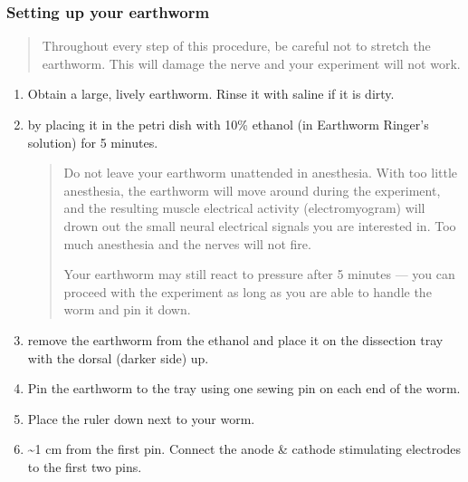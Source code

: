 \documentclass[letterpaper,10pt,english]{jupyterBook}
\begin{document}
\subsubsection{Setting up your earthworm}
\label{\detokenize{Earthworm:setting-up-your-earthworm}}
\sphinxAtStartPar
{}
\begin{quote}

\sphinxAtStartPar
{} Throughout every step of this procedure, be careful not to stretch the earthworm. This will damage the nerve and your experiment will not work.
\end{quote}
\begin{enumerate}
%
\item {} 
\sphinxAtStartPar
Obtain a large, lively earthworm. Rinse it with saline if it is dirty.

\item {} 
\sphinxAtStartPar
{} by placing it in the petri dish with 10\% ethanol (in Earthworm Ringer’s solution) for 5 minutes.
\begin{quote}

\sphinxAtStartPar
{} Do not leave your earthworm unattended in anesthesia. With too little anesthesia, the earthworm will move around during the experiment, and the resulting muscle electrical activity (electromyogram) will drown out the small neural electrical signals you are interested in. Too much anesthesia and the nerves will not fire.

\sphinxAtStartPar
{} Your earthworm may still react to pressure after 5 minutes — you can proceed with the experiment as long as you are able to handle the worm and pin it down.
\end{quote}

\item {} 
\sphinxAtStartPar
{} remove the earthworm from the ethanol and place it on the dissection tray with the dorsal (darker side) up.

\item {} 
\sphinxAtStartPar
Pin the earthworm to the tray using one sewing pin on each end of the worm.

\item {} 
\sphinxAtStartPar
Place the ruler down next to your worm.

\item {} 
\sphinxAtStartPar
{} \textasciitilde{}1 cm from the first pin. Connect the anode \& cathode stimulating electrodes to the first two pins.
\begin{quote}


\end{quote}
\end{enumerate}
\end{document}

